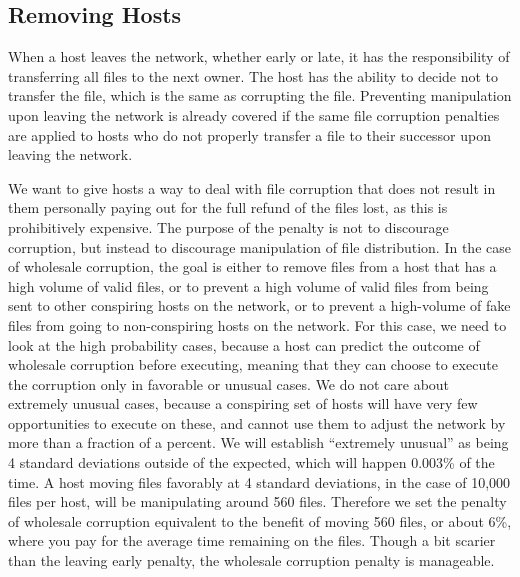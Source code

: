 \documentclass[twocolumn]{article}
\begin{document}
\subsection{Removing Hosts}
When a host leaves the network, whether early or late, it has the responsibility of transferring all files to the next owner.
The host has the ability to decide not to transfer the file, which is the same as corrupting the file.
Preventing manipulation upon leaving the network is already covered if the same file corruption penalties are applied to hosts who do not properly transfer a file to their successor upon leaving the network.

We want to give hosts a way to deal with file corruption that does not result in them personally paying out for the full refund of the files lost, as this is prohibitively expensive.
The purpose of the penalty is not to discourage corruption, but instead to discourage manipulation of file distribution.
In the case of wholesale corruption, the goal is either to remove files from a host that has a high volume of valid files, or to prevent a high volume of valid files from being sent to other conspiring hosts on the network, or to prevent a high-volume of fake files from going to non-conspiring hosts on the network.
For this case, we need to look at the high probability cases, because a host can predict the outcome of wholesale corruption before executing, meaning that they can choose to execute the corruption only in favorable or unusual cases.
We do not care about extremely unusual cases, because a conspiring set of hosts will have very few opportunities to execute on these, and cannot use them to adjust the network by more than a fraction of a percent.
We will establish ``extremely unusual'' as being 4 standard deviations outside of the expected, which will happen 0.003\% of the time.
A host moving files favorably at 4 standard deviations, in the case of 10,000 files per host, will be manipulating around 560 files.
Therefore we set the penalty of wholesale corruption equivalent to the benefit of moving 560 files, or about 6\%, where you pay for the average time remaining on the files.
Though a bit scarier than the leaving early penalty, the wholesale corruption penalty is manageable.
\end{document}
